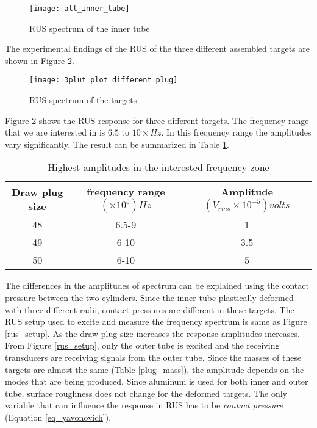 \begin{doublespacing}
\begin{figure}[H]
\centering
\texttt{[image: all\_inner\_tube]}
\caption{RUS spectrum of the inner tube}
\label{fig_inner_tube}
\end{figure}

The experimental findings of the RUS of the three different assembled targets are shown in Figure \ref{target_rus}. \\[0.3 in]
\begin{figure}[H]
\centering
\texttt{[image: 3plut\_plot\_different\_plug]} 
\caption{RUS spectrum of the targets}  
\label{target_rus} 
\end{figure}

Figure \ref{target_rus} shows the RUS response for three different targets. The frequency range that we are interested in is $6.5$ to $10\times Hz$. In this frequency range the amplitudes vary significantly. The result can be summarized in Table \ref{amplitude_plug}.  \\[0.3 in]
\begin{table}[H]
\caption{Highest amplitudes in the interested frequency zone }
\centering
\begin{tabular}{c|c|c}
\hline\hline
Draw plug size & frequency range $(\times 10^5) Hz$ & Amplitude $(V_{rms}\times 10^{-5}) volts$\\
\hline
48 & 6.5-9 & 1 \\
49 & 6-10 & 3.5 \\
50 & 6-10 & 5 \\
\hline
\end{tabular}
\label{amplitude_plug}
\end{table}



The differences in the amplitudes of spectrum can be explained using the contact pressure between the two cylinders. Since the inner tube plastically deformed with three different radii, contact pressures are different in these targets. The RUS setup used to excite and measure the frequency spectrum is same as Figure \ref{rus_setup}. As the draw plug size increases the response amplitudes increases. From Figure \ref{rus_setup}, only the outer tube is excited and the receiving transducers are receiving signals from the outer tube. Since the masses of these targets are almost the same (Table \ref{plug_mass}), the amplitude depends on the modes that are being produced. Since aluminum is used for both inner and outer tube, surface roughness does not change for the deformed targets. The only variable that can influence the response in RUS has to be \textit{contact pressure} (Equation \ref{eq_yavonovich}). 


\end{doublespacing}
